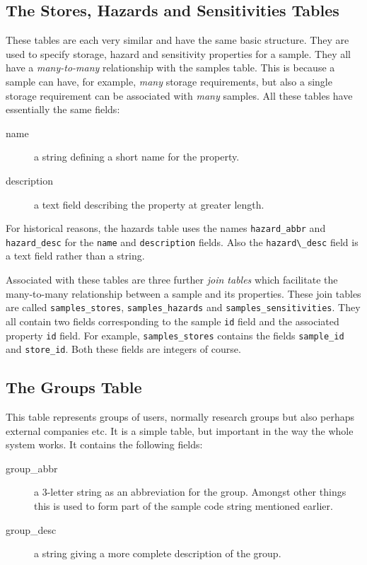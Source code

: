 \documentclass[12pt]{article}
\begin{document}
\subsection{The Stores, Hazards and Sensitivities Tables}
These tables are each very similar and have the same basic structure.
They are used to specify storage, hazard and sensitivity properties
for a sample. They all have a \emph{many-to-many} relationship with
the samples table. This is because a sample can have, for example,
\emph{many} storage requirements, but also a single storage requirement
can be associated with \emph{many} samples.
All these tables have essentially the same fields:
\begin{description}
\item[name]
a string defining a short name for the property.
\item[description]
a text field describing the property at greater length.
\end{description}
For historical reasons, the hazards table uses the names
\verb=hazard_abbr= and \verb=hazard_desc= for the \verb=name= and
\verb=description= fields. Also the \verb=hazard\_desc= field is a text
field rather than a string.

Associated with these tables are three further \emph{join tables} which
facilitate the many-to-many relationship between a sample and its
properties. These join tables are called \verb=samples_stores=,
\verb=samples_hazards= and \verb=samples_sensitivities=. They all contain
two fields corresponding to the sample \verb=id= field and the associated
property \verb=id= field. For example, \verb=samples_stores= contains the
fields \verb=sample_id= and \verb=store_id=. Both these fields are integers
of course.

\subsection{The Groups Table}
This table represents groups of users, normally research groups but also
perhaps external companies etc.
It is a simple table, but important in the way the whole system works.
It contains the following fields:

\begin{description}
\item[group\_abbr]
a 3-letter string as an abbreviation for the group. Amongst other things
this is used to form part of the sample code string mentioned earlier.
\item[group\_desc]
a string giving a more complete description of the group.
\end{description}
\end{document}
